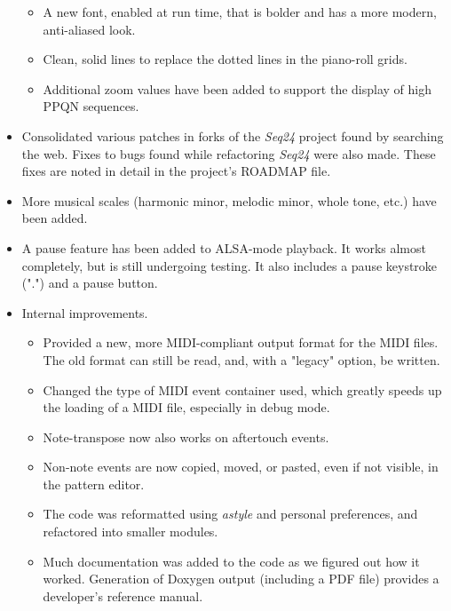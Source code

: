 \documentclass[
 11pt,
 twoside,
 a4paper,
 headinclude,
 footinclude,
 final                                 %
]{article}
\begin{document}
\begin{itemize}
\begin{itemize}
         \item A new font, enabled at run time, that is bolder and has a
            more modern, anti-aliased look.
         \item Clean, solid lines to replace the dotted lines in the piano-roll
            grids.
         \item Additional zoom values have been added to support the display
            of high PPQN sequences.
      \end{itemize}
      \item Consolidated various patches in forks of the \textsl{Seq24}
         project found by searching the web.  Fixes to bugs found while
         refactoring \textsl{Seq24} were also made.  These fixes are noted in
         detail in the project's ROADMAP file.
      \item More musical scales (harmonic minor, melodic minor,
         whole tone, etc.) have been added.
      \item A pause feature has been added to ALSA-mode playback.  It works
         almost completely, but is still undergoing testing.  It also includes
         a pause keystroke (".") and a pause button.
      \item Internal improvements.
      \begin{itemize}
         \item Provided a new, more MIDI-compliant output format for the MIDI
            files.  The old format can still be read, and, with a "legacy"
            option, be written.
         \item Changed the type of MIDI event container used, which greatly
            speeds up the loading of a MIDI file, especially in debug mode.
         \item Note-transpose now also works on aftertouch events.
         \item Non-note events are now copied, moved, or pasted, even if not
            visible, in the pattern editor.
         \item The code was reformatted using \textsl{astyle} and
            personal preferences, and refactored into smaller modules.
         \item Much documentation was added to the code as we figured
            out how it worked.  Generation of Doxygen output (including a PDF
            file) provides a developer's reference manual.

\end{itemize}
\end{itemize}
\end{document}
